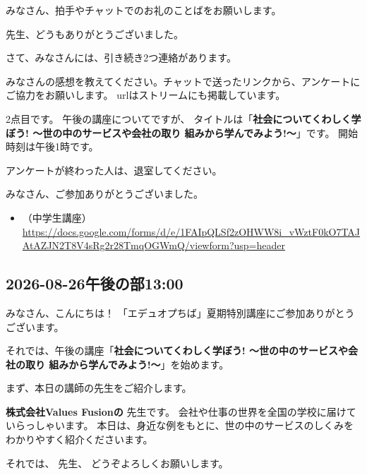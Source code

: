 \documentclass[12pt, jafontscale=0.9247]{jlreq}
\begin{document}
みなさん、拍手やチャットでのお礼のことばをお願いします。

先生、どうもありがとうございました。

\bigskip

さて、みなさんには、引き続き2つ連絡があります。

みなさんの感想を教えてください。チャットで送ったリンクから、アンケートにご協力をお願いします。 urlはストリームにも掲載しています。

2点目です。 午後の講座についてですが、 タイトルは「{\gtfamily\bfseries 社会についてくわしく学ぼう! ～世の中のサービスや会社の取り 組みから学んでみよう!～}」です。
開始時刻は午後1時です。

アンケートが終わった人は、退室してください。

みなさん、ご参加ありがとうございました。

\begin{itemize}

  \item （中学生講座）\\
        \url{https://docs.google.com/forms/d/e/1FAIpQLSf2zOHWW8i_vWztF0kO7TAJAtAZJN2T8V4sRg2r28TmqOGWmQ/viewform?usp=header}
\end{itemize}
\newpage

\subsection*{2026-08-26午後の部13:00}
みなさん、こんにちは！ 「エデュオプちば」夏期特別講座にご参加ありがとうございます。

\bigskip

それでは、午後の講座「{\gtfamily\bfseries 社会についてくわしく学ぼう! ～世の中のサービスや会社の取り 組みから学んでみよう!～}」を始めます。

まず、本日の講師の先生をご紹介します。

{\gtfamily\bfseries 株式会社Values Fusionの}
先生です。 会社や仕事の世界を全国の学校に届けていらっしゃいます。
本日は、身近な例をもとに、世の中のサービスのしくみをわかりやすく紹介くださいます。

それでは、{\gtfamily\bfseries {}} 先生、
どうぞよろしくお願いします。
\end{document}
